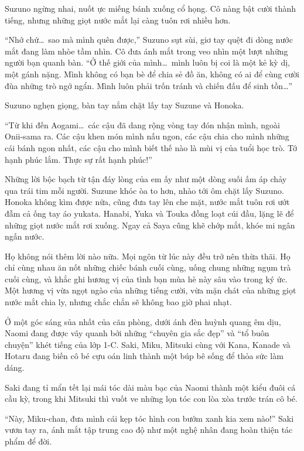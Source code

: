 \documentclass[../main.tex]{subfiles}
\begin{document}
Suzuno ngừng nhai, nuốt ực miếng bánh xuống cổ họng. Cô nàng bật cười thành tiếng, nhưng những giọt nước mắt lại càng tuôn rơi nhiều hơn.

``Nhớ chứ\dots\ sao mà mình quên được,'' Suzuno sụt sùi, giơ tay quệt đi dòng nước mắt đang làm nhòe tầm nhìn. Cô đưa ánh mắt trong veo nhìn một lượt những người bạn quanh bàn. ``Ở thế giới của mình\dots\ mình luôn bị coi là một kẻ kỳ dị, một gánh nặng. Mình không có bạn bè để chia sẻ đồ ăn, không có ai để cùng cười đùa những trò ngớ ngẩn. Mình luôn phải trốn tránh và chiến đấu để sinh tồn\dots''

Suzuno nghẹn giọng, bàn tay nắm chặt lấy tay Suzune và Honoka.

``Từ khi đến Aogami\dots\ các cậu đã dang rộng vòng tay đón nhận mình, ngoài Onii-sama ra. Các cậu khen món mình nấu ngon, các cậu chia cho mình những cái bánh ngon nhất, các cậu cho mình biết thế nào là mùi vị của tuổi học trò. Tớ hạnh phúc lắm. Thực sự rất hạnh phúc!''

Những lời bộc bạch từ tận đáy lòng của em ấy như một dòng suối ấm áp chảy qua trái tim mỗi người. Suzune khóc òa to hơn, nhào tới ôm chặt lấy Suzuno. Honoka không kìm được nữa, cũng đưa tay lên che mặt, nước mắt tuôn rơi ướt đẫm cả ống tay áo yukata. Hanabi, Yuka và Touka đồng loạt cúi đầu, lặng lẽ để những giọt nước mắt rơi xuống. Ngay cả Saya cũng khẽ chớp mắt, khóe mi ngân ngấn nước.

Họ không nói thêm lời nào nữa. Mọi ngôn từ lúc này đều trở nên thừa thãi. Họ chỉ cùng nhau ăn nốt những chiếc bánh cuối cùng, uống chung những ngụm trà cuối cùng, và khắc ghi hương vị của tình bạn mùa hè này sâu vào trong ký ức. Một hương vị vừa ngọt ngào của những tiếng cười, vừa mặn chát của những giọt nước mắt chia ly, nhưng chắc chắn sẽ không bao giờ phai nhạt.

\ct

Ở một góc sáng sủa nhất của căn phòng, dưới ánh đèn huỳnh quang êm dịu, Naomi đang được vây quanh bởi những ``chuyên gia sắc đẹp'' và ``tổ buôn chuyện'' khét tiếng của lớp 1-C. Saki, Miku, Mitsuki cùng với Kana, Kanade và Hotaru đang biến cô bé cựu oán linh thành một búp bê sống để thỏa sức làm dáng.

Saki đang tỉ mẩn tết lại mái tóc dài màu bạc của Naomi thành một kiểu đuôi cá cầu kỳ, trong khi Mitsuki thì vuốt ve những lọn tóc con lòa xòa trước trán cô bé.

``Này, Miku-chan, đưa mình cái kẹp tóc hình con bướm xanh kia xem nào!'' Saki vươn tay ra, ánh mắt tập trung cao độ như một nghệ nhân đang hoàn thiện tác phẩm để đời.
\end{document}
